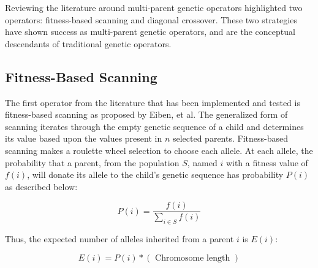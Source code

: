 Reviewing the literature around multi-parent genetic operators highlighted two operators: fitness-based scanning and diagonal crossover. These two strategies have shown success as multi-parent genetic operators, and are the conceptual descendants of traditional genetic operators.

\subsection*{Fitness-Based Scanning}
The first operator from the literature that has been implemented and tested is fitness-based scanning as proposed by Eiben, et al\cite{Eiben94}. The generalized form of scanning iterates through the empty genetic sequence of a child and determines its value based upon the values present in $n$ selected parents\cite{Eiben91}. Fitness-based scanning makes a roulette wheel selection to choose each allele. At each allele, the probability that a parent, from the population $S$, named $i$ with a fitness value of $f(i)$, will donate its allele to the child's genetic sequence has probability $P(i)$ as described below\cite{Eiben94}: 

\[ P(i) = \frac{f(i)}{\sum\limits_{i \in S} f(i)} \]

\noindent Thus, the expected number of alleles inherited from a parent $i$ is $E(i)$\cite{Eiben94}:

\[ E(i) = P(i) *(\text{ Chromosome length }) \]

